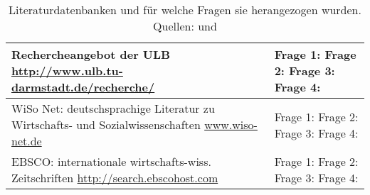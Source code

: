 \begin{table}[bh]
\begin{tabular}{|p{}|p{}|}
	\hline
	Rechercheangebot der ULB 
	\newline \url{http://www.ulb.tu-darmstadt.de/recherche/} & 
	Frage 1: \newline
	Frage 2: \newline
	Frage 3: \newline 
	Frage 4: \\
	\hline
	WiSo Net: deutschsprachige Literatur zu Wirtschafts- und 
	Sozialwissenschaften \newline \url{www.wiso-net.de} & 
	Frage 1: \newline
	Frage 2: \newline
	Frage 3: \newline 
	Frage 4: \\
	\hline
	EBSCO: internationale wirtschafts-wiss. Zeitschriften \newline 
	\url{http://search.ebscohost.com} &  
	Frage 1: \newline
	Frage 2: \newline
	Frage 3: \newline 
	Frage 4: \\
	\hline
\end{tabular}
\caption{Literaturdatenbanken und für welche Fragen sie herangezogen wurden. 
Quellen: \cite{exploring_the_factors} und \cite{formatvorlage}}
\label{tab:literaturdatenbanken}
\end{table}

\begin{comment}
\subsubsection{Sonstiges}
\begin{itemize}
\item \textbf{Google Scholar:} Suchdienst für wissenschaftliche Recherchen 
(http://scholar.google.de)
\item \textbf{Verlagswebseiten} Recherche und den Zugriff auf Zeitschriften- 
und 
Zeitungsartikel und E-Books
\item \textbf{Webseiten von Unternehmen} für die Recherche von 
Unternehmensdaten 
und-statistiken sowie Unternehmensdatenbanken
\item \textbf{Webseiten von Bundes- und Landesbehörden sowie der EU}
 Statistisches Bundesamt (http://www.destatis.de)
\\Presse- und Informationsamt der Bundesregierung 
(http://www.bundesregierung.de)
\item \textbf{Webseiten von Marktforschungsinstituten}
(für Marktanteile und Verbraucheranalysen)
\item \textbf{Webseiten von Verbänden und Kammern}
Institut der deutschen Wirtschaft (http://www.deutsche-wirtschaft.de)
\end{itemize}
\end{comment}
